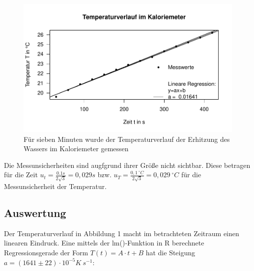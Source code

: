 \documentclass[
  9pt,
]{article}
\newenvironment{Shaded}{\begin{snugshade}}{\end{snugshade}}
\newcommand{\CommentTok}[1]{\textcolor[rgb]{0.56,0.35,0.01}{\textit{#1}}}
\newcommand{\FunctionTok}[1]{\textcolor[rgb]{0.00,0.00,0.00}{#1}}
\newcommand{\NormalTok}[1]{#1}
\newcommand{\OtherTok}[1]{\textcolor[rgb]{0.56,0.35,0.01}{#1}}
\newcommand{\SpecialCharTok}[1]{\textcolor[rgb]{0.00,0.00,0.00}{#1}}
\begin{document}
\begin{figure}

{\centering \includegraphics{Kaloriemeter_files/figure-latex/unnamed-chunk-1-1} 

}

\caption{Für sieben Minuten wurde der Temperaturverlauf der Erhitzung des Wassers im Kaloriemeter gemessen}\label{fig:unnamed-chunk-1}
\end{figure}

Die Messunsicherheiten sind augfgrund ihrer Größe nicht sichtbar. Diese
betragen für die Zeit \(u_t = \frac{0.1s}{2\sqrt{3}}=0,029s\) bzw.
\(u_T = \frac{0,1\ ^{\circ}C}{2\sqrt{3}}=0,029\ ^{\circ}C\) für die
Messunsicherheit der Temperatur.

\hypertarget{auswertung}{%
\subsection{Auswertung}\label{auswertung}}

Der Temperaturverlauf in Abbildung 1 macht im betrachteten Zeitraum
einen linearen Eindruck. Eine mittels der lm()-Funktion in R berechnete
Regressionsgerade der Form \(T(t)=A\cdot t+B\) hat die Steigung
\(a=(1641\pm 22)\cdot 10^{-5}K\ s^{-1}\):

\begin{Shaded}
\end{Shaded}
\end{document}

